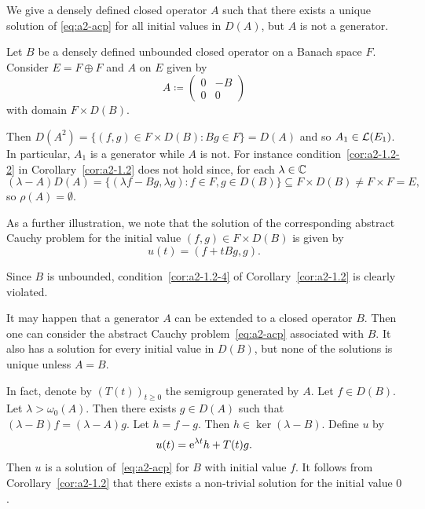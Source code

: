 \begin{example}\label{ex:a2-1.4}
We give a densely defined closed operator $ A $ such that there exists a unique solution of \eqref{eq:a2-acp} for all initial values in $ D(A) $, but $ A $ is not a generator.

Let $ B $ be a densely defined unbounded closed operator on a Banach space $ F $.
Consider $ E = F \oplus F $ and $ A $ on $ E $ given by
\[
    A \coloneq \begin{pmatrix} 0 & -B \\ 0 & 0 \end{pmatrix}
\]
with domain $ F \times D(B) $.

Then $ D(A^{2}) = \{(f,g) \in F \times D(B) \colon Bg \in F\} = D(A) $ and so $ A_{1} \in \mathcal{L}(E_{1}) $.
In particular, $ A_{1} $ is a generator while
$ A $ is not. For instance
condition~\ref{cor:a2-1.2-2}   in Corollary~\ref{cor:a2-1.2}   does not hold since, for each $ \lambda \in \mathbb{C} $
\[
    (\lambda-A)D(A) = \{(\lambda f-Bg,\lambda g) \colon f \in F, g \in D(B)\} \subseteq F \times D(B) \neq F \times F = E ,
\]
so $ \rho(A) = \emptyset $.

As a further illustration, we note that the solution of the corresponding abstract Cauchy problem for the initial value $ (f,g) \in F \times D(B) $ is given by 
\[
u(t) = (f + tBg,g) .
\] 

Since $ B $ is unbounded, condition~\ref{cor:a2-1.2-4}  of Corollary~\ref{cor:a2-1.2}  is clearly violated.
\end{example}
\begin{remark*}\label{rem:a2-1.4-kgk} 
It may happen that a generator $A$ can be extended to a closed operator $B$.
Then one can consider the abstract Cauchy problem~\eqref{eq:a2-acp} associated with $B$.
It also has a solution for every initial value in $D(B)$, but none of the solutions is unique unless $A = B$.

In fact, denote by $(T(t))_{t \geq 0}$ the semigroup generated by $A$.
Let $f \in D(B)$.
Let $\lambda > \omega_{0}(A)$.
Then there exists $g \in D(A)$ such that $(\lambda-B)f = (\lambda-A)g$.
Let $h = f - g$.
Then $h \in \ker(\lambda-B)$.
Define $u$ by 
%
\[
	u(t) = \mathrm{e}^{\lambda t}h + T(t)g .
\]
%
Then $u$ is a solution of~\eqref{eq:a2-acp} for $B$ with initial value $f$.
It follows from Corollary~\ref{cor:a2-1.2} that there exists a non-trivial solution for the initial value $0$.
\end{remark*}

